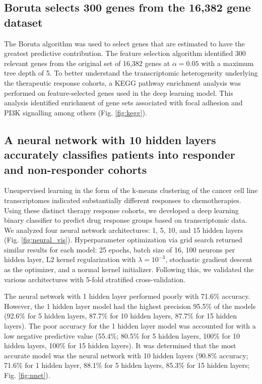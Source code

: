 \documentclass[10pt, letterpaper, twocolumn]{article}
\begin{document}
\subsection{Boruta selects 300 genes from the 16,382 gene dataset}
The Boruta algorithm was used to select genes that are estimated to have the greatest predictive contribution. The feature selection algorithm identified 300 relevant genes from the original set of 16,382 genes at $\alpha=0.05$ with a maximum tree depth of 5. To better understand the transcriptomic heterogeneity underlying the therapeutic response cohorts, a KEGG pathway enrichment analysis was performed on feature-selected genes used in the deep learning model. This analysis identified enrichment of gene sets associated with focal adhesion and PI3K signalling among others (Fig. \ref{fig:kegg}).


\subsection{A neural network with 10 hidden layers accurately classifies patients into responder and non-responder cohorts}
Unsupervised learning in the form of the k-means clustering of the cancer cell line transcriptomes indicated substantially different responses to chemotherapies. Using these distinct therapy response cohorts, we developed a deep learning binary classifier to predict drug response groups based on transcriptomic data. We analyzed four neural network architectures: 1, 5, 10, and 15 hidden layers (Fig. \ref{fig:neural_vis}). Hyperparameter optimization via grid search returned similar results for each model: 25 epochs, batch size of 16, 100 neurons per hidden layer, L2 kernel regularization with $\lambda=10^{-3}$, stochastic gradient descent as the optimizer, and a normal kernel initializer. Following this, we validated the various architectures with 5-fold stratified cross-validation.

The neural network with 1 hidden layer performed poorly with 71.6\% accuracy. However, the 1 hidden layer model had the highest precision 95.5\% of the models (92.6\% for 5 hidden layers, 87.7\% for 10 hidden layers, 87.7\% for 15 hidden layers). The poor accuracy for the 1 hidden layer model was accounted for with a low negative predictive value (55.4\%; 80.5\% for 5 hidden layers, 100\% for 10 hidden layers, 100\% for 15 hidden layers). It was determined that the most accurate model was the neural network with 10 hidden layers (90.8\% accuracy; 71.6\% for 1 hidden layer, 88.1\% for 5 hidden layers, 85.3\% for 15 hidden layers; Fig. \ref{fig:nnet}).
\end{document}
